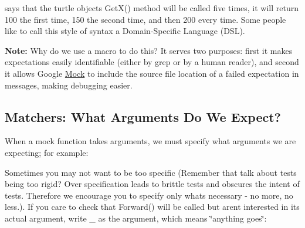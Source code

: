 \begin{DoxyCode}{0}
\end{DoxyCode}


says that the {\ttfamily turtle} object\textquotesingle{}s {\ttfamily Get\+X()} method will be called five times, it will return 100 the first time, 150 the second time, and then 200 every time. Some people like to call this style of syntax a Domain-\/\+Specific Language (D\+SL).

{\bfseries{Note\+:}} Why do we use a macro to do this? It serves two purposes\+: first it makes expectations easily identifiable (either by {\ttfamily grep} or by a human reader), and second it allows Google \mbox{\hyperlink{classMock}{Mock}} to include the source file location of a failed expectation in messages, making debugging easier.

\subsection*{Matchers\+: What Arguments Do We Expect?}

When a mock function takes arguments, we must specify what arguments we are expecting; for example\+:


\begin{DoxyCode}{0}
\end{DoxyCode}


Sometimes you may not want to be too specific (Remember that talk about tests being too rigid? Over specification leads to brittle tests and obscures the intent of tests. Therefore we encourage you to specify only what\textquotesingle{}s necessary -\/ no more, no less.). If you care to check that {\ttfamily Forward()} will be called but aren\textquotesingle{}t interested in its actual argument, write {\ttfamily \+\_\+} as the argument, which means \char`\"{}anything goes\char`\"{}\+:


\begin{DoxyCode}{0}
\end{DoxyCode}


